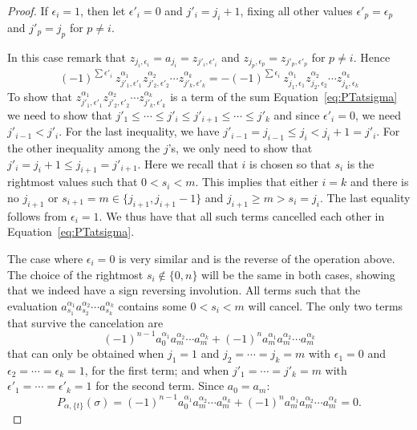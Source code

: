 \documentclass[11pt,oneside]{amsart}
\theoremstyle{definition}
\numberwithin{equation}{section}
\begin{document}
\begin{proof}
\medskip
\noindent
If $\epsilon_i=1$, then let $\epsilon'_i=0$ and $j'_i=j_i+1$, fixing all other values $\epsilon'_p=\epsilon_p$ and $j'_p=j_p$ for $p\not= i$.

\medskip
In this case remark that $z_{j_i,\epsilon_i}=a_{j_i}=z_{j'_i,\epsilon'_i}$ and $z_{j_p,\epsilon_p}=z_{j'_p,\epsilon'_p}$ for  $p\not= i$. Hence
 $$ (-1)^{\sum \epsilon'_i}\ z_{j'_1,\epsilon'_1}^{\alpha_1}z_{j'_2,\epsilon'_2}^{\alpha_2} \cdots z_{j'_k,\epsilon'_k}^{\alpha_k}
  = - (-1)^{\sum \epsilon_i}\ z_{j_1,\epsilon_1}^{\alpha_1}z_{j_2,\epsilon_2}^{\alpha_2} \cdots z_{j_k,\epsilon_k}^{\alpha_k}$$
 To show that $z_{j'_1,\epsilon'_1}^{\alpha_1}z_{j'_2,\epsilon'_2}^{\alpha_2} \cdots z_{j'_k,\epsilon'_k}^{\alpha_k}$ is a term of the sum Equation~\eqref{eq:PTatsigma}
 we need to show that $j'_1\le\cdots\le j'_{i}\le j'_{i+1}\le\cdots\le j'_{k}$ and since $\epsilon'_i=0$, we need $j'_{i-1}<j'_i$.
 For the last inequality, we have $j'_{i-1}=j_{i-1}\le j_i<j_i+1=j'_i$. For the other inequality among the $j$'s, we only need to show that $j'_{i}=j_i+1\le j_{i+1}= j'_{i+1}$.
 Here we recall that $i$ is chosen so that $s_i$ is the rightmost values such that $0<s_i<m$. This implies that either $i=k$ and there is no $j_{i+1}$ or $s_{i+1}=m\in\{j_{i+1},j_{i+1}-1\}$
 and $j_{i+1}\ge m >s_i=j_i$. The last equality follows from $\epsilon_i=1$. We thus have that all such terms cancelled each other in Equation~\eqref{eq:PTatsigma}.
 
 The case where $\epsilon_i=0$ is very similar and is the reverse of the operation above. The choice of the rightmost $s_i\not\in\{0,n\}$ will be the same in both cases, showing that we indeed
 have a sign reversing involution. All terms such that the evaluation $a_{s_1}^{\alpha_1}a_{s_2}^{\alpha_2}\cdots a_{s_k}^{\alpha_k}$ contains some $0<s_i<m$ will cancel.
 The only two terms that survive the cancelation are
 $$(-1)^{n-1}a_{0}^{\alpha_1}a_{m}^{\alpha_2}\cdots a_{m}^{\alpha_k}+  (-1)^n a_{m}^{\alpha_1}a_{m}^{\alpha_2}\cdots a_{m}^{\alpha_k}$$
 that can only be obtained when $j_1=1$ and $j_2=\cdots=j_k=m$ with $\epsilon_1=0$ and $\epsilon_2=\cdots=\epsilon_k=1$, for the first term;
 and when $j'_1=\cdots=j'_k=m$ with $\epsilon'_1=\cdots=\epsilon'_k=1$ for the second term. Since $a_0=a_m$:
  $$P_{\alpha,\{t\}}(\sigma)=(-1)^{n-1}a_{0}^{\alpha_1}a_{m}^{\alpha_2}\cdots a_{m}^{\alpha_k}+  (-1)^n a_{m}^{\alpha_1}a_{m}^{\alpha_2}\cdots a_{m}^{\alpha_k}=0.$$



\end{proof}
\end{document}
